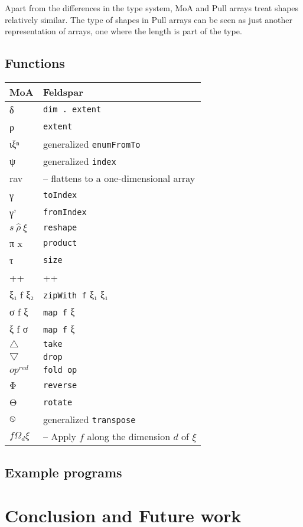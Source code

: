 \documentclass{sigplanconf}
\begin{document}
Apart from the differences in the type system, MoA and Pull arrays
treat shapes relatively similar. The type of shapes in Pull arrays can
be seen as just another representation of arrays, one where the length
is part of the type.

\subsection{Functions}
\label{sec:notation}

\begin{tabular}{|@{}l|l@{}|}
\hline
MoA & Feldspar
\\
\hline
δ & \verb!dim . extent!
\\
ρ & \verb!extent!
\\
ιξⁿ & generalized \verb!enumFromTo!
\\
ψ & generalized \verb!index!
\\
rav & -- flattens to a one-dimensional array
\\
γ & \verb!toIndex!
\\
γ' & \verb!fromIndex!
\\
$s \: \hat{ρ} \: ξ$ & \verb!reshape!
\\
π x & \verb!product!
\\
τ & \verb!size!
\\
++ & ++
\\
ξ₁ f ξ₂ & \verb!zipWith f! ξ₁ ξ₁
\\
σ f ξ & \verb!map f! ξ
\\
ξ f σ & \verb!map f! ξ
\\
$\bigtriangleup$ & \verb!take!
\\
$\bigtriangledown$ & \verb!drop!
\\
$op^{red}$ & \verb!fold op!
\\
Φ & \verb!reverse!
\\
Θ & \verb!rotate!
\\
$\varobslash$ & generalized \verb!transpose!
\\
$f Ω_d ξ$ & -- Apply $f$ along the dimension $d$ of $ξ$
\\
\hline
\end{tabular}

\subsection{Example programs}

\section{Conclusion and Future work}
\end{document}
